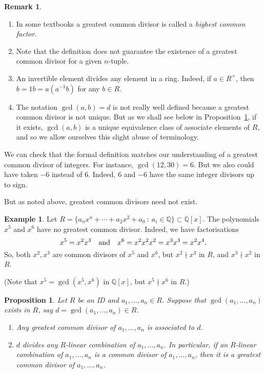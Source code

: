 \documentclass[12pt]{article}
\newcommand{\qbox}[1]{\quad\hbox{#1}\quad}
\newtheorem{prop}[thm]{Proposition}
\theoremstyle{definition}
\newtheorem{example}[thm]{Example}
\newtheorem{remark}[thm]{Remark}
\newcounter{ex}\renewcommand\theex{\arabic{ex}}
\newcommand{\Q}{\ensuremath{\mathbb{Q}}}
\begin{document}
\begin{remark}\

\begin{enumerate}
\item
In some textbooks a greatest common divisor is called a {\em highest
common factor}.
\item
Note that the definition does not guarantee the existence of a
greatest common divisor for a given $n$-tuple.
\item
An invertible element divides any element in a ring. Indeed, if
$a\in R^\times$, then $b=1b=a(a^{-1}b)$ for any $b\in R$. 
\item The notation $\gcd(a,b)=d$ is not really well defined because a
greatest common divisor is not unique. But as we shall see below in
Proposition~\ref{prop:gcd0}, if it exists, $\gcd(a,b)$ is a unique
equivalence class of associate elements of $R$, and so we allow
ourselves this slight abuse of terminology.
\end{enumerate}
\end{remark}

We can check that the formal definition matches our understanding of
a greatest common divisor of integers. For instance,
$\gcd(12,30)=6$. But we also could have taken $-6$ instead of
$6$. Indeed, $6$ and $-6$ have the same integer divisors up to
sign.

But as noted above, greatest common divisors need not exist.

\begin{example}\label{ex:no-gcd}
Let $R=\{a_nx^n+\cdots+a_2x^2+a_0~:~a_i\in\Q\}\subset\Q[x]$. The polynomials $x^5$
and $x^6$ have no greatest common divisor.
Indeed, we have factorisations
$$x^5=x^2x^3\qbox{and}x^6=x^2x^2x^2=x^3x^3=x^2x^4.$$
So, both $x^2,x^3$ are common divisors of $x^5$ and $x^6$, but
$x^2\nmid x^3$ in $R$, and $x^3\nmid x^2$ in $R$. 

(Note that $x^5=\gcd(x^5,x^6)$ in $\Q[x]$, but $x^5\nmid x^6$ in $R$.) 
\end{example}

\begin{prop}\label{prop:gcd0}
Let $R$ be an ID and $a_1,\dots,a_n\in R$. Suppose
that $\gcd(a_1,\dots,a_n)$ exists in $R$, say
$d=\gcd(a_1,\dots,a_n)\in R$.
\begin{enumerate}
\item Any greatest common
divisor of $a_1,\dots,a_n$ is associated to $d$.
\item
$d$ divides any $R$-linear combination of $a_1,\dots,a_n$.
In particular, if an $R$-linear combination of $a_1,\dots,a_n$ is a
common divisor of $a_1,\dots,a_n$, then it is a greatest common
divisor of $a_1,\dots,a_n$.
\end{enumerate}
\end{prop}
\end{document}
